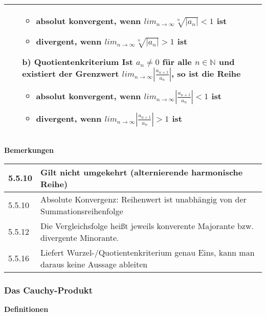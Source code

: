 \begin{longtable}{p{1cm} p{16cm}}
\begin{itemize}[topsep=-0.5cm]
\begin{itemize}[topsep=-0.5cm]
                                \item absolut konvergent, wenn $lim_{n \rightarrow \infty} \sqrt[n]{|a_n|} < 1$ ist
                                \item divergent, wenn $lim_{n \rightarrow \infty} \sqrt[n]{|a_n|} > 1$ ist
                            \end{itemize}
                    \item[b)] \textbf{Quotientenkriterium} \hfill \break
                            Ist $a_n \neq 0$ für alle $n \in \mathbb{N}$ und existiert der Grenzwert 
                            $lim_{n \rightarrow \infty} |\frac{a_{n+1}}{a_n}|$, so ist die Reihe
                            \begin{itemize}[topsep=-0.5cm]
                                \item absolut konvergent, wenn $lim_{n \rightarrow \infty} |\frac{a_{n+1}}{a_n}| < 1$ ist
                                \item divergent, wenn $lim_{n \rightarrow \infty} |\frac{a_{n+1}}{a_n}| > 1$ ist
                            \end{itemize}
                \end{itemize} \vspace{-0cm} \\

        \bottomrule
    \end{longtable}
    

    \noindent
    \textbf{Bemerkungen}
    
    \begin{longtable}{p{1cm} p{16cm}}
        \toprule

        5.5.10& Gilt nicht umgekehrt (alternierende harmonische Reihe)  \\
        \midrule
        5.5.10& Absolute Konvergenz: Reihenwert ist unabhängig von der Summationsreihenfolge \\
        \midrule
        5.5.12& Die Vergleichsfolge heißt jeweils konverente Majorante bzw. divergente Minorante. \\
        \midrule
        5.5.16& Liefert Wurzel-/Quotientenkriterium genau Eins, kann man daraus keine Aussage ableiten \\

        \bottomrule
    \end{longtable}
    

\subsubsection{Das Cauchy-Produkt}
\noindent
\textbf{Definitionen}
  

